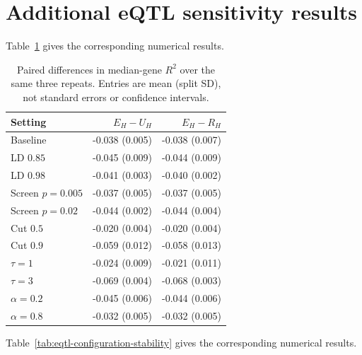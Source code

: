 \documentclass[11pt,a4paper]{article}
\begin{document}
\FloatBarrier

\section{Additional eQTL sensitivity results}\label{app:eqtl-sensitivity}
\noindent Table~\ref{tab:eqtl-sensitivity-paired} gives the corresponding numerical results.

\begin{table}[htbp]\centering\small
\caption{Paired differences in median-gene $R^2$ over the same three repeats. Entries are mean (split SD), not standard errors or confidence intervals.}\label{tab:eqtl-sensitivity-paired}
\begin{tabular}{lrr}\toprule
Setting & $E_H-U_H$ & $E_H-R_H$\\\midrule
Baseline & -0.038 (0.005) & -0.038 (0.007) \\
LD $0.85$ & -0.045 (0.009) & -0.044 (0.009) \\
LD $0.98$ & -0.041 (0.003) & -0.040 (0.002) \\
Screen $p=0.005$ & -0.037 (0.005) & -0.037 (0.005) \\
Screen $p=0.02$ & -0.044 (0.002) & -0.044 (0.004) \\
Cut $0.5$ & -0.020 (0.004) & -0.020 (0.004) \\
Cut $0.9$ & -0.059 (0.012) & -0.058 (0.013) \\
$\tau=1$ & -0.024 (0.009) & -0.021 (0.011) \\
$\tau=3$ & -0.069 (0.004) & -0.068 (0.003) \\
$\alpha=0.2$ & -0.045 (0.006) & -0.044 (0.006) \\
$\alpha=0.8$ & -0.032 (0.005) & -0.032 (0.005) \\
\bottomrule\end{tabular}\end{table}
\noindent Table~\ref{tab:eqtl-configuration-stability} gives the corresponding numerical results.
\end{document}
